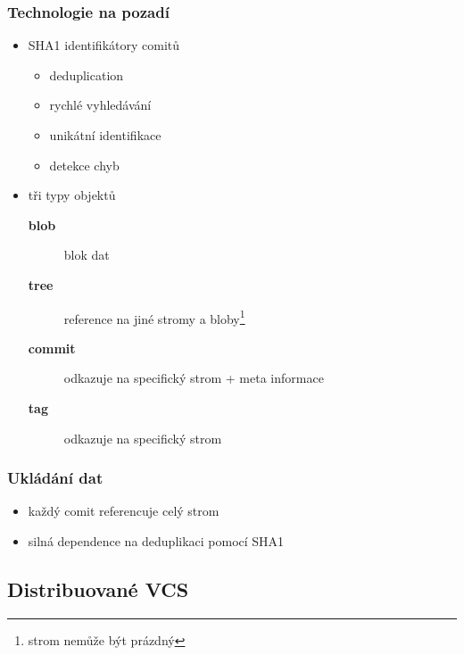 \begin{frame}
	\frametitle{Technologie na pozadí}
	\begin{itemize}
		\item{SHA1 identifikátory comitů}
		\begin{itemize}
			\item{deduplication}
			\item{rychlé vyhledávání}
			\item{unikátní identifikace}
			\item{detekce chyb}
		\end{itemize}
		\item{tři typy objektů}
		\begin{description}
			\item[\textbf{blob}]{blok dat}
			\item[\textbf{tree}]{reference na jiné stromy a bloby\footnote{strom nemůže být prázdný}}
			\item[\textbf{commit}]{odkazuje na specifický strom + meta informace}
			\item[\textbf{tag}]{odkazuje na specifický strom}
		\end{description}
	\end{itemize}
\end{frame}

\begin{frame}
	\frametitle{Ukládání dat}
	\begin{itemize}
		\item{každý comit referencuje celý strom}
		\item{silná dependence na deduplikaci pomocí SHA1}
	\end{itemize}
\end{frame}

\subsection{Distribuované VCS}

